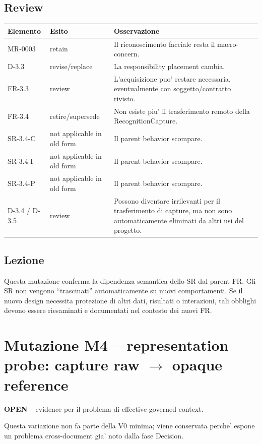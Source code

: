 \documentclass[11pt,a4paper]{article}
\newcommand{\openstatus}{\textbf{OPEN}}
\begin{document}
\subsection{Review}

\begin{longtable}{p{}p{}p{}}
\toprule
\textbf{Elemento} & \textbf{Esito} & \textbf{Osservazione} \\
\midrule
\endhead
MR-0003 & retain & Il riconoscimento facciale resta il macro-concern. \\
D-3.3 & revise/replace & La responsibility placement cambia. \\
FR-3.3 & review & L'acquisizione puo' restare necessaria, eventualmente con soggetto/contratto rivisto. \\
FR-3.4 & retire/supersede & Non esiste piu' il trasferimento remoto della RecognitionCapture. \\
SR-3.4-C & not applicable in old form & Il parent behavior scompare. \\
SR-3.4-I & not applicable in old form & Il parent behavior scompare. \\
SR-3.4-P & not applicable in old form & Il parent behavior scompare. \\
D-3.4 / D-3.5 & review & Possono diventare irrilevanti per il trasferimento di capture, ma non sono automaticamente eliminati da altri usi del progetto. \\
\bottomrule
\end{longtable}

\subsection{Lezione}

Questa mutazione conferma la dipendenza semantica dello SR dal parent FR. Gli SR non vengono ``trascinati'' automaticamente su nuovi comportamenti. Se il nuovo design necessita protezione di altri dati, risultati o interazioni, tali obblighi devono essere riesaminati e documentati nel contesto dei nuovi FR.

\section{Mutazione M4 -- representation probe: capture raw $\rightarrow$ opaque reference}

\openstatus{} -- evidence per il problema di effective governed context.

Questa variazione non fa parte della V0 minima; viene conservata perche' espone un problema cross-document gia' noto dalla fase Decision.
\end{document}
